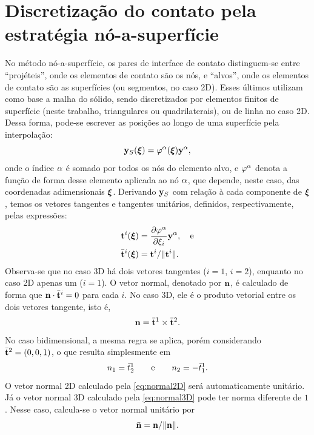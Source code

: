 \documentclass[Tese.tex]{subfiles}
\begin{document}
\section{Discretização do contato pela estratégia nó-a-superfície}\label{sec:disc-contato}

No método nó-a-superfície, os pares de interface de contato distinguem-se entre ``projéteis'', onde os elementos de contato são os nós, e ``alvos'', onde os elementos de contato são as superfícies (ou segmentos, no caso 2D). Esses últimos utilizam como base a malha do sólido, sendo discretizados por elementos finitos de superfície (neste trabalho, triangulares ou quadrilaterais), ou de linha no caso 2D.  Dessa forma, pode-se escrever as posições ao longo de uma superfície pela interpolação:
\begin{equation}\label{eq:yS}
\mathbf{y}_S(\boldsymbol{\xi}) = \varphi^\alpha(\boldsymbol{\xi})\mathbf{y}^\alpha,
\end{equation}
onde o índice $\alpha$ é somado por todos os nós do elemento alvo, e $\varphi^\alpha$ denota a função de forma desse elemento aplicada ao nó $\alpha$, que depende, neste caso, das coordenadas adimensionais $\boldsymbol{\xi}$. Derivando $\mathbf{y}_S$ com relação à cada componente de $\boldsymbol{\xi}$, temos os vetores tangentes e tangentes unitários, definidos, respectivamente, pelas expressões:
\begin{align}
&\mathbf{t}^i(\boldsymbol{\xi}) = \dfrac{\partial\varphi^\alpha}{\partial{\xi}_i}\mathbf{y}^\alpha, \quad\text{e}\\
&\bar{\mathbf{t}}^i(\boldsymbol{\xi}) = \mathbf{t}^i/\|\mathbf{t}^i\|.
\end{align}
Observa-se que no caso 3D há dois vetores tangentes ($i=1$, $i=2$), enquanto no caso 2D apenas um ($i=1$). O vetor normal, denotado por $\mathbf{n}$, é calculado de forma que $\mathbf{n}\cdot\bar{\mathbf{t}}^i = 0$ para cada $i$. No caso 3D, ele é o produto vetorial entre os dois vetores tangente, isto é,
\begin{equation}\label{eq:normal3D}
\mathbf{n} = \bar{\mathbf{t}}^1 \times \bar{\mathbf{t}}^2.
\end{equation}
No caso bidimensional, a mesma regra se aplica, porém considerando $\bar{\mathbf{t}}^2 = (0,0,1)$, o que resulta simplesmente em
\begin{equation}\label{eq:normal2D}
{n}_1 = \bar{{t}}^1_2 \text{\qquad e\qquad} {n}_2 = -\bar{{t}}^1_1.
\end{equation}
O vetor normal 2D calculado pela \autoref{eq:normal2D} será automaticamente unitário. Já o vetor normal 3D calculado pela \autoref{eq:normal3D} pode ter norma diferente de $1$. Nesse caso, calcula-se o vetor normal unitário por
\begin{equation}
\bar{\mathbf{n}} = \mathbf{n}/\|\mathbf{n}\|.
\end{equation}
\end{document}

